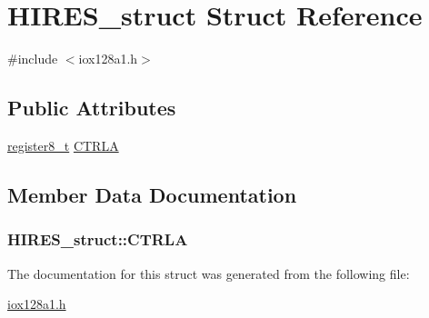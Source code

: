 \hypertarget{struct_h_i_r_e_s__struct}{
\section{HIRES\_\-struct Struct Reference}
\label{struct_h_i_r_e_s__struct}
}


{\ttfamily \#include $<$iox128a1.h$>$}

\subsection*{Public Attributes}
\begin{DoxyCompactItemize}
\item 
\hyperlink{iox128a1_8h_a6a0649252b392263406882923b04a9db}{register8\_\-t} \hyperlink{struct_h_i_r_e_s__struct_af5bf0dd7e01fed75a2b790fae08ba2cb}{CTRLA}
\end{DoxyCompactItemize}


\subsection{Member Data Documentation}
\hypertarget{struct_h_i_r_e_s__struct_af5bf0dd7e01fed75a2b790fae08ba2cb}{
\subsubsection[{CTRLA}]{ {\bf HIRES\_\-struct::CTRLA}}}
\label{struct_h_i_r_e_s__struct_af5bf0dd7e01fed75a2b790fae08ba2cb}


The documentation for this struct was generated from the following file:\begin{DoxyCompactItemize}
\item 
\hyperlink{iox128a1_8h}{iox128a1.h}\end{DoxyCompactItemize}
